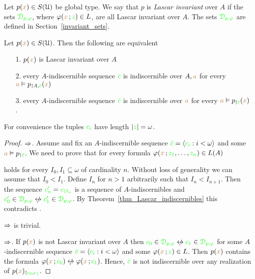 Let $p({\color{brown} x})\in S(\EuScript U)$ be global type.
We say that $p$ is \emph{Lascar invariant\/} over $A$ if the sets ${\color{green}\EuScript D_{p,\varphi}}$, where $\varphi({\color{brown} x}\,;{\color{green} z})\in L$, are all Lascar invariant over $A$.
The sets ${\color{green}\EuScript D_{p,\varphi}}$ are defined in Section~\ref{invariant_sets}.

\begin{proposition}\label{prop_Lascar_indiscernibles}
  Let $p({\color{brown} x})\in S(\EuScript U)$.
  Then the following are equivalent
  \begin{itemize}
    \item[1.] $p({\color{brown} x})$ is Lascar invariant over $A$
    \item[2.] every $A$-indiscernible sequence ${\color{green}\bar c}$ is indiscernible over $A,{\color{brown} a}$ for every ${\color{brown} a}\vDash p_{\restriction A,{\color{green}\bar c}}({\color{brown} x})$
    \item[3.] every $A$-indiscernible sequence ${\color{green}\bar c}$ is indiscernible over ${\color{brown} a}$ for every ${\color{brown} a}\vDash p_{\restriction {\color{green}\bar c}}({\color{brown} x})$.
  \end{itemize}
  For convenience the tuples ${\color{green} c_i}$ have length $|{\color{green} z}|=\omega$.
\end{proposition}
\begin{proof} $\Rightarrow$.
Assume  and fix an $A$-indiscernible sequence ${\color{green}\bar c}=\langle{\color{green}c_i}:i<\omega\rangle$ and some ${\color{brown} a}\vDash p_{\restriction{\color{green}\bar c}}$.
  We need to prove that for every formula $\varphi({\color{brown} x}\,;{\color{green} z_1},\dots,{\color{green} z_n})\in L(A)$


  holds for every $I_0,I_1\subseteq\omega$ of cardinality $n$.
  Without loss of generality we can assume that $I_0<I_1$.
  Define $I_n$ for $n>1$ arbitrarily such that $I_n<I_{n+1}$.
  Then the sequence ${\color{green} c'_n}={\color{green} c_{\restriction I_n}}$ is a sequence of $A$-in\-dis\-cern\-i\-bles and ${\gr c'_0}\in{\gr\D_{p,\phi}}\niff {\gr c'_1}\in{\gr\D_{p,\phi}}$.
  By Theorem~\ref{thm_Lascar_indiscernibles} this contradicts .
  
  $\Rightarrow$ is trivial.

  $\Rightarrow$.
  If $p({\color{brown} x})$ is not Lascar invariant over $A$ then ${\gr c_0}\in{\gr\D_{p,\phi}}\niff {\gr c_1}\in{\gr\D_{p,\phi}}$ for some $A$-indiscernible sequence ${\color{green}\bar c}=\langle{\color{green}c_i}:i<\omega\rangle$ and some $\varphi({\color{brown} x}\,;{\color{green} z})\in L$.
  Then $p({\color{brown} x})$ contains the formula $\phi({\mr x}\,;{\gr c_0})\niff \phi({\mr x}\,;{\gr c_1})$.
  Hence, ${\color{green}\bar c}$ is not indiscernible over any realization of $p({\color{brown} x})_{\restriction{\color{green}c_0},{\color{green} c_1}}$.
\end{proof}

